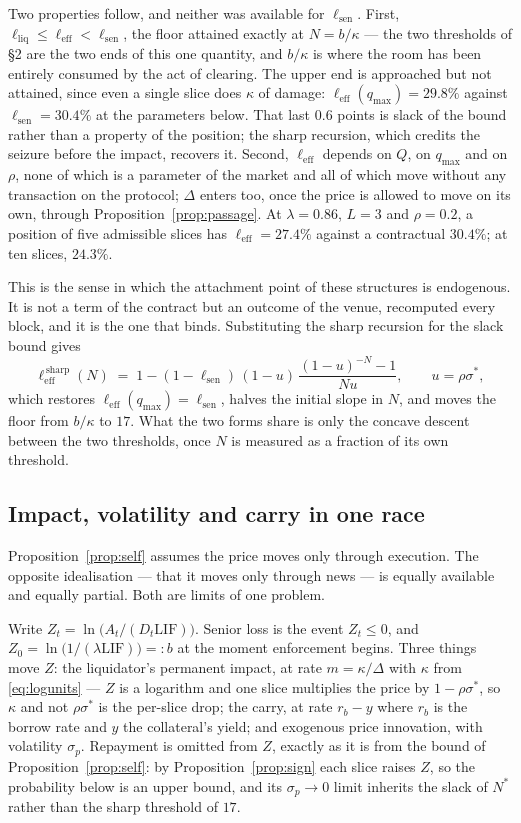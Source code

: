 \documentclass[11pt,a4paper]{article}
\theoremstyle{plain}
\theoremstyle{definition}
\theoremstyle{remark}
\newcommand{\LIF}{\mathrm{LIF}}
\begin{document}
Two properties follow, and neither was available for $\ell_{\mathrm{sen}}$. First,
$\ell_{\mathrm{liq}} \leq \ell_{\mathrm{eff}} < \ell_{\mathrm{sen}}$, the floor attained exactly
at $N=b/\kappa$ --- the two thresholds of \S2 are the two ends of this one quantity, and $b/\kappa$
is where the room has been entirely consumed by the act of clearing. The upper end is approached
but not attained, since even a single slice does $\kappa$ of damage: $\ell_{\mathrm{eff}}(q_{\max})
= 29.8\%$ against $\ell_{\mathrm{sen}}=30.4\%$ at the parameters below. That last $0.6$ points is
slack of the bound rather than a property of the position; the sharp recursion, which credits the
seizure before the impact, recovers it. Second, $\ell_{\mathrm{eff}}$ depends on $Q$, on $q_{\max}$
and on $\rho$, none of which is a parameter of the market and all of which move without any
transaction on the protocol; $\Delta$ enters too, once the price is allowed to move on its own,
through Proposition~\ref{prop:passage}. At $\lambda=0.86$, $L=3$ and $\rho=0.2$, a position of five
admissible slices has $\ell_{\mathrm{eff}}=27.4\%$ against a contractual $30.4\%$; at ten slices,
$24.3\%$.

This is the sense in which the attachment point of these structures is endogenous. It is not a
term of the contract but an outcome of the venue, recomputed every block, and it is the one that
binds. Substituting the sharp recursion for the slack bound gives
\[
  \ell_{\mathrm{eff}}^{\,\mathrm{sharp}}(N) \;=\;
  1-(1-\ell_{\mathrm{sen}})\,(1-u)\,\frac{(1-u)^{-N}-1}{Nu}, \qquad u=\rho\sigma^{*},
\]
which restores $\ell_{\mathrm{eff}}(q_{\max})=\ell_{\mathrm{sen}}$, halves the initial slope in $N$,
and moves the floor from $b/\kappa$ to $17$. What the two forms share is only the concave descent
between the two thresholds, once $N$ is measured as a fraction of its own threshold.

\subsection{Impact, volatility and carry in one race}

Proposition~\ref{prop:self} assumes the price moves only through execution. The opposite
idealisation --- that it moves only through news --- is equally available and equally partial.
Both are limits of one problem.

Write $Z_t = \ln\bigl(A_t/(D_t\LIF)\bigr)$. Senior loss is the event $Z_t \leq 0$, and
$Z_0 = \ln\bigl(1/(\lambda\LIF)\bigr) =: b$ at the moment enforcement begins. Three things move
$Z$: the liquidator's permanent impact, at rate $m=\kappa/\Delta$ with $\kappa$ from
\eqref{eq:logunits} --- $Z$ is a logarithm and one slice multiplies the price by $1-\rho\sigma^{*}$,
so $\kappa$ and not $\rho\sigma^{*}$ is the per-slice drop; the carry, at rate
$r_b-y$ where $r_b$ is the borrow rate and $y$ the collateral's yield; and exogenous price
innovation, with volatility $\sigma_p$. Repayment is omitted from $Z$, exactly as it is from the bound of
Proposition~\ref{prop:self}: by Proposition~\ref{prop:sign} each slice raises $Z$, so the
probability below is an upper bound, and its $\sigma_p\to0$ limit inherits the slack of $N^{*}$
rather than the sharp threshold of $17$.
\end{document}
